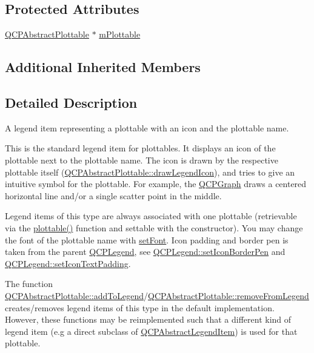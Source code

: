 \subsection*{Protected Attributes}
\begin{DoxyCompactItemize}
\item 
\hyperlink{class_q_c_p_abstract_plottable}{Q\-C\-P\-Abstract\-Plottable} $\ast$ \hyperlink{class_q_c_p_plottable_legend_item_ada647fb4b22971a1a424e15b4f6af0d9}{m\-Plottable}
\end{DoxyCompactItemize}
\subsection*{Additional Inherited Members}


\subsection{Detailed Description}
A legend item representing a plottable with an icon and the plottable name. 

This is the standard legend item for plottables. It displays an icon of the plottable next to the plottable name. The icon is drawn by the respective plottable itself (\hyperlink{class_q_c_p_abstract_plottable_a9a450783fd9ed539e589999fd390cdf7}{Q\-C\-P\-Abstract\-Plottable\-::draw\-Legend\-Icon}), and tries to give an intuitive symbol for the plottable. For example, the \hyperlink{class_q_c_p_graph}{Q\-C\-P\-Graph} draws a centered horizontal line and/or a single scatter point in the middle.

Legend items of this type are always associated with one plottable (retrievable via the \hyperlink{class_q_c_p_plottable_legend_item_af29e9a2c60b4cba0cac2447b8af7b488}{plottable()} function and settable with the constructor). You may change the font of the plottable name with \hyperlink{class_q_c_p_abstract_legend_item_a409c53455d8112f71d70c0c43eb10265}{set\-Font}. Icon padding and border pen is taken from the parent \hyperlink{class_q_c_p_legend}{Q\-C\-P\-Legend}, see \hyperlink{class_q_c_p_legend_a2f2c93d18a651f4ff294bb3f026f49b8}{Q\-C\-P\-Legend\-::set\-Icon\-Border\-Pen} and \hyperlink{class_q_c_p_legend_a62973bd69d5155e8ea3141366e8968f6}{Q\-C\-P\-Legend\-::set\-Icon\-Text\-Padding}.

The function \hyperlink{class_q_c_p_abstract_plottable_a70f8cabfd808f7d5204b9f18c45c13f5}{Q\-C\-P\-Abstract\-Plottable\-::add\-To\-Legend}/\hyperlink{class_q_c_p_abstract_plottable_aa1f350e510326d012b9a9c9249736c83}{Q\-C\-P\-Abstract\-Plottable\-::remove\-From\-Legend} creates/removes legend items of this type in the default implementation. However, these functions may be reimplemented such that a different kind of legend item (e.\-g a direct subclass of \hyperlink{class_q_c_p_abstract_legend_item}{Q\-C\-P\-Abstract\-Legend\-Item}) is used for that plottable.

